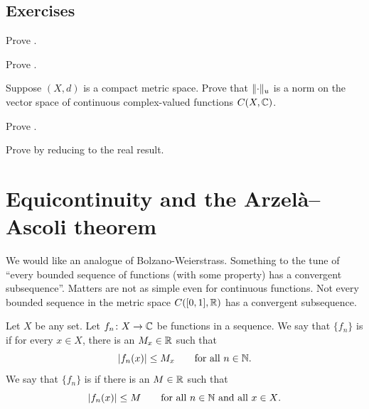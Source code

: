 \subsection{Exercises}

\begin{exercise}
Prove .
\end{exercise}

\begin{exercise}
Prove .
\end{exercise}

\begin{exercise}
Suppose $(X,d)$ is a compact metric space.
Prove that $\lVert {\cdot} \rVert_u$ is a norm on the vector space of
continuous complex-valued functions $C(X,{\mathbb{C}})$.
\end{exercise}

\begin{exercise}
Prove .
\end{exercise}

\begin{exercise}
Prove  by reducing to the real
result.
\end{exercise}


\sectionnewpage
\section{Equicontinuity and the Arzel{\` a}--Ascoli theorem}
\label{sec:arzelaascoli}


We would like an analogue of Bolzano-Weierstrass.  Something to the tune of
``every bounded
sequence of functions (with some property) has a convergent subsequence''.
Matters are not
as simple even for continuous functions. 
Not every bounded sequence in the metric space $C([0,1],{\mathbb{R}})$ has
a convergent subsequence.

\begin{defn}
Let $X$ be any set.
Let $f_n \colon X \to {\mathbb{C}}$ be functions in a sequence.  We say that
$\{ f_n \}$
is \emph{} if for every $x \in X$, there is an $M_x \in {\mathbb{R}}$
such that
\begin{equation*}
\lvert {f_n(x)} \rvert \leq M_x \qquad \text{for all $n \in {\mathbb{N}}$} .
\end{equation*}
We say that
$\{ f_n \}$
is \emph{} if there is an $M \in {\mathbb{R}}$
such that
\begin{equation*}
\lvert {f_n(x)} \rvert \leq M \qquad \text{for all $n \in {\mathbb{N}}$ and all $x \in X$}.
\end{equation*}
\end{defn}

